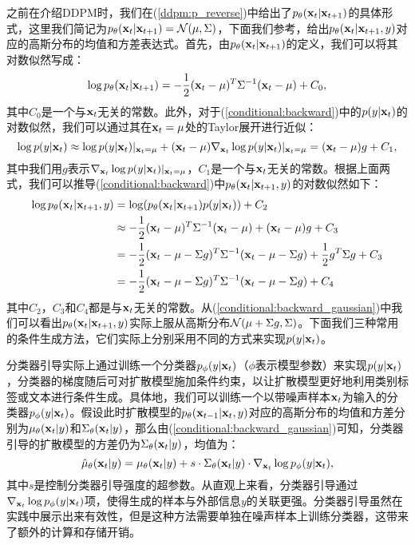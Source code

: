 \documentclass[11pt,a4paper,UTF8]{ctexart}
\begin{document}
之前在介绍DDPM时，我们在(\ref{ddpm:p_reverse})中给出了$p_\theta(\mathbf{x}_{t}|\mathbf{x}_{t+1})$的具体形式，这里我们简记为$p_\theta(\mathbf{x}_{t}|\mathbf{x}_{t+1})=\mathcal{N}(\mu,\Sigma)$，下面我们参考\cite{dhariwal2021diffusion}，给出$p_{\theta}(\mathbf{x}_{t}|\mathbf{x}_{t+1},y)$对应的高斯分布的均值和方差表达式。首先，由$p_{\theta}(\mathbf{x}_{t}|\mathbf{x}_{t+1})$的定义，我们可以将其对数似然写成：
\begin{equation*}
    \log p_{\theta}(\mathbf{x}_{t}|\mathbf{x}_{t+1}) = -\frac{1}{2}(\mathbf{x}_t-\mu)^{T}\Sigma^{-1}(\mathbf{x}_t-\mu) + C_0,
\end{equation*}
其中$C_0$是一个与$\mathbf{x}_t$无关的常数。此外，对于(\ref{conditional:backward})中的$p(y|\mathbf{x}_t)$的对数似然，我们可以通过其在$\mathbf{x}_t=\mu$处的Taylor展开进行近似：
\begin{equation*}
    \log p(y|\mathbf{x}_t)\approx \log p(y|\mathbf{x}_t)|_{\mathbf{x}_t=\mu} + (\mathbf{x}_t-\mu)\nabla_{\mathbf{x}_t} \log p(y|\mathbf{x}_t)|_{\mathbf{x}_t=\mu} = (\mathbf{x}_t-\mu)g + C_1,
\end{equation*}
其中我们用$g$表示$\nabla_{\mathbf{x}_t} \log p(y|\mathbf{x}_t)|_{\mathbf{x}_t=\mu}$，$C_1$是一个与$\mathbf{x}_t$无关的常数。根据上面两式，我们可以推导(\ref{conditional:backward})中$p_{\theta}(\mathbf{x}_{t}|\mathbf{x}_{t+1},y)$的对数似然如下：
\begin{align}
\begin{split}
    \log p_{\theta}(\mathbf{x}_{t}|\mathbf{x}_{t+1},y) &= \log(p_\theta(\mathbf{x}_{t}|\mathbf{x}_{t+1})p(y|\mathbf{x}_t)) + C_2 \\
    &\approx -\frac{1}{2}(\mathbf{x}_t-\mu)^{T}\Sigma^{-1}(\mathbf{x}_t-\mu) + (\mathbf{x}_t-\mu)g + C_3 \\
    &= -\frac{1}{2} (\mathbf{x}_t-\mu-\Sigma g)^{T}\Sigma^{-1}(\mathbf{x}_t-\mu-\Sigma g) + \frac{1}{2}g^T\Sigma g + C_3 \\
    &= -\frac{1}{2} (\mathbf{x}_t-\mu-\Sigma g)^{T}\Sigma^{-1}(\mathbf{x}_t-\mu-\Sigma g) + C_4
\end{split}
\label{conditional:backward_gaussian}
\end{align}
其中$C_2$，$C_3$和$C_4$都是与$\mathbf{x}_t$无关的常数。从(\ref{conditional:backward_gaussian})中我们可以看出$p_{\theta}(\mathbf{x}_{t}|\mathbf{x}_{t+1},y)$实际上服从高斯分布$\mathcal{N}(\mu+\Sigma g,\Sigma)$。下面我们三种常用的条件生成方法，它们实际上分别采用不同的方式来实现$p(y|\mathbf{x}_t)$。


分类器引导\cite{dhariwal2021diffusion}实际上通过训练一个分类器$p_{\phi}(y|\mathbf{x}_t)$（$\phi$表示模型参数）来实现$p(y|\mathbf{x}_t)$，分类器的梯度随后可对扩散模型施加条件约束，以让扩散模型更好地利用类别标签或文本进行条件生成。具体地，我们可以训练一个以带噪声样本$\mathbf{x}_t$为输入的分类器$p_{\phi}(y|\mathbf{x}_t)$。假设此时扩散模型的$p_{\theta}(\mathbf{x}_{t-1}|\mathbf{x}_t,y)$对应的高斯分布的均值和方差分别为$\mu_\theta(\mathbf{x}_t|y)$和$\Sigma_\theta(\mathbf{x}_t|y)$，那么由(\ref{conditional:backward_gaussian})可知，分类器引导的扩散模型的方差仍为$\Sigma_\theta(\mathbf{x}_t|y)$，均值为：
\begin{equation}
\hat{\mu}_{\theta}(\mathbf{x}_t|y)=\mu_{\theta}(\mathbf{x}_t|y) + s\cdot\Sigma_\theta(\mathbf{x}_t|y)\cdot\nabla_{\mathbf{x}_t}\log p_{\phi}(y|\mathbf{x}_t),
\label{conditional_classifier_guided}
\end{equation}
其中$s$是控制分类器引导强度的超参数。从直观上来看，分类器引导通过$\nabla_{\mathbf{x}_t}\log p_{\phi}(y|\mathbf{x}_t)$项，使得生成的样本与外部信息$y$的关联更强。分类器引导虽然在实践中展示出来有效性，但是这种方法需要单独在噪声样本上训练分类器，这带来了额外的计算和存储开销。
\end{document}
